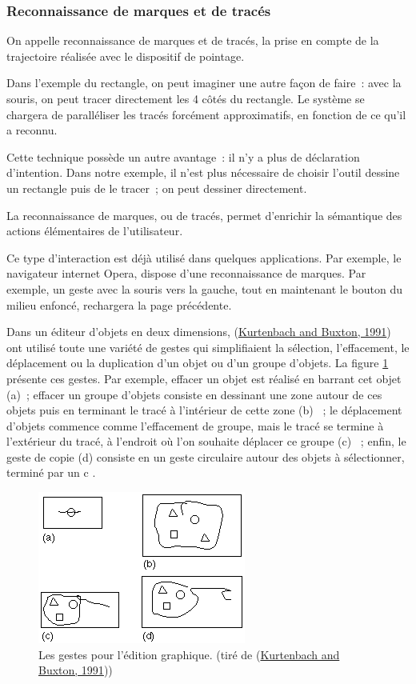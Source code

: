 \documentclass[
]{book}
\begin{document}
\hypertarget{reconnaissance-de-marques-et-de-tracuxe9s}{%
\subsubsection{Reconnaissance de marques et de tracés}\label{reconnaissance-de-marques-et-de-tracuxe9s}}

On appelle reconnaissance de marques et de tracés, la prise en compte de
la trajectoire réalisée avec le dispositif de pointage.

Dans l'exemple du rectangle, on peut imaginer une autre façon de faire~:
avec la souris, on peut tracer directement les 4 côtés du rectangle. Le
système se chargera de paralléliser les tracés forcément approximatifs, en
fonction de ce qu'il a reconnu.

Cette technique possède un autre avantage~: il n'y a plus de déclaration
d'intention. Dans notre exemple, il n'est plus nécessaire de choisir l'outil
dessine un rectangle puis de le tracer~; on peut dessiner directement.

La reconnaissance de marques, ou de tracés, permet d'enrichir la
sémantique des actions élémentaires de l'utilisateur.

Ce type d'interaction est déjà utilisé dans quelques applications. Par
exemple, le navigateur internet Opera, dispose d'une reconnaissance de
marques. Par exemple, un geste avec la souris vers la gauche, tout en
maintenant le bouton du milieu enfoncé, rechargera la page précédente.

Dans un éditeur d'objets en deux dimensions, (\protect\hyperlink{ref-kurtenbach1991issues}{Kurtenbach and Buxton, 1991}) ont utilisé
toute une variété de gestes qui simplifiaient la sélection, l'effacement, le
déplacement ou la duplication d'un objet ou d'un groupe d'objets. La
figure \ref{fig:gestes1} présente ces gestes. Par
exemple, effacer un objet est réalisé en barrant cet objet (a)~; effacer un
groupe d'objets consiste en dessinant une zone autour de ces objets puis en
terminant le tracé à l'intérieur de cette zone (b) ~; le déplacement d'objets
commence comme l'effacement de groupe, mais le tracé se termine à l'extérieur
du tracé, à l'endroit où l'on souhaite déplacer ce groupe (c) ~; enfin, le
geste de copie (d) consiste en un geste circulaire autour des objets à
sélectionner, terminé par un c .

\begin{figure}
\centering
\includegraphics{img/BarfieldF16.png}
\caption{\label{fig:gestes1}Les gestes pour l'édition graphique. (tiré de
(\protect\hyperlink{ref-kurtenbach1991issues}{Kurtenbach and Buxton, 1991}))}
\end{figure}
\end{document}
